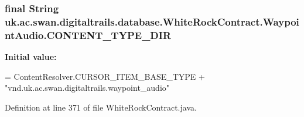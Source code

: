 \hypertarget{classuk_1_1ac_1_1swan_1_1digitaltrails_1_1database_1_1_white_rock_contract_1_1_waypoint_audio_a36f6175ca88469a5536b138d9c3b8bae}{
\subsubsection[{C\+O\+N\+T\+E\+N\+T\+\_\+\+T\+Y\+P\+E\+\_\+\+D\+I\+R}]{\setlength{\rightskip}{0pt plus 5cm}final String uk.\+ac.\+swan.\+digitaltrails.\+database.\+White\+Rock\+Contract.\+Waypoint\+Audio.\+C\+O\+N\+T\+E\+N\+T\+\_\+\+T\+Y\+P\+E\+\_\+\+D\+I\+R\hspace{0.3cm}{\ttfamily [static]}}}\label{classuk_1_1ac_1_1swan_1_1digitaltrails_1_1database_1_1_white_rock_contract_1_1_waypoint_audio_a36f6175ca88469a5536b138d9c3b8bae}
{\bfseries Initial value\+:}
\begin{DoxyCode}
= ContentResolver.CURSOR\_ITEM\_BASE\_TYPE +
                \textcolor{stringliteral}{"vnd.uk.ac.swan.digitaltrails.waypoint\_audio"}
\end{DoxyCode}


Definition at line 371 of file White\+Rock\+Contract.\+java.

